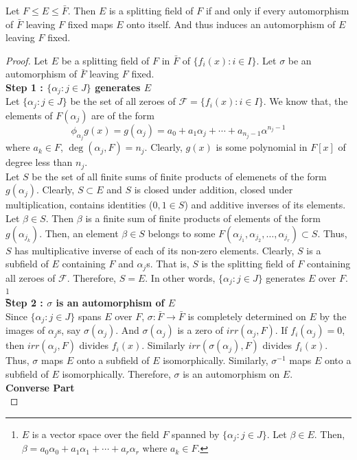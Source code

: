 \begin{theorem}
	Let $F \le E \le \bar{F}$.
	Then $E$ is a splitting field of $F$ if and only if every automorphism of $\bar{F}$ leaving $F$ fixed maps $E$ onto itself.
	And thus induces an automorphism of $E$ leaving $F$ fixed.
\end{theorem}
\begin{proof}
	Let $E$ be a splitting field of $F$ in $\bar{F}$ of $\{ f_i(x) : i \in I \}$.
	Let $\sigma$ be an automorphism of $\bar{F}$ leaving $F$ fixed.\\

	\textbf{Step 1 : $\{ \alpha_j : j \in J \}$ generates $E$}\\
	Let $\{ \alpha_j : j \in J\}$ be the set of all zeroes of $\mathscr{F} = \{ f_i(x) : i \in I\}$.
	We know that, the elements of  $F(\alpha_j)$ are of the form
	\[ \phi_{\alpha_j} g(x) = g(\alpha_j) =  a_0 + a_1 \alpha_j + \dotsb + a_{n_j-1}\alpha^{n_j-1} \]
	where $a_k \in F$, $\deg(\alpha_j,F) = n_j$.
	Clearly, $g(x)$ is some polynomial in $F[x]$ of degree less than $n_j$.\\

	Let $S$ be the set of all finite sums of finite products of elemenets of the form $g(\alpha_j)$.
	Clearly, $S \subset E$ and $S$ is closed under addition, closed under multiplication, contains identities ($0, 1 \in S$) and additive inverses of its elements.\\

	Let $\beta \in S$.
	Then $\beta$ is a finite sum of finite products of elements of the form $g(\alpha_{j_k})$.
	Then, an element $\beta \in S$ belongs to some $F(\alpha_{j_1},\alpha_{j_2},\dots,\alpha_{j_r}) \subset S$.
	Thus, $S$ has multiplicative inverse of each of its non-zero elements.
	Clearly, $S$ is a subfield of $E$ containing $F$ and $\alpha_j$s.
	That is, $S$ is the splitting field of $F$ containing all zeroes of $\mathscr{F}$.
	Therefore, $S = E$.
	In other words, $\{ \alpha_j : j \in J \}$ generates $E$ over $F$.
	\dag\footnote{$E$ is a vector space over the field $F$ spanned by $\{ \alpha_j : j \in J \}$. 
	Let $\beta \in E$.
	Then, $\beta = a_0 \alpha_0 + a_1 \alpha_1 + \dotsb + a_r \alpha_r$ where $a_k \in F$.}\\

	\textbf{Step 2 : $\sigma$ is an automorphism of $E$}\\
	Since $\{ \alpha_j : j \in J \}$ spans $E$ over $F$, $\sigma : \bar{F} \to \bar{F}$ is completely determined on $E$ by the images of $\alpha_j$s, say $\sigma(\alpha_j)$.
	And $\sigma(\alpha_j)$ is a zero of $irr(\alpha_j,F)$.
	If $f_i(\alpha_j) = 0$, then $irr(\alpha_j,F)$ divides $f_i(x)$.
	Similarly $irr(\sigma(\alpha_j),F)$ divides $f_i(x)$.
	Thus, $\sigma$ maps $E$ onto a subfield of $E$ isomorphically.
	Similarly, $\sigma^{-1}$ maps $E$ onto a subfield of $E$ isomorphically.
	Therefore, $\sigma$ is an automorphism on $E$.\\

	\textbf{Converse Part}\\

\end{proof}

